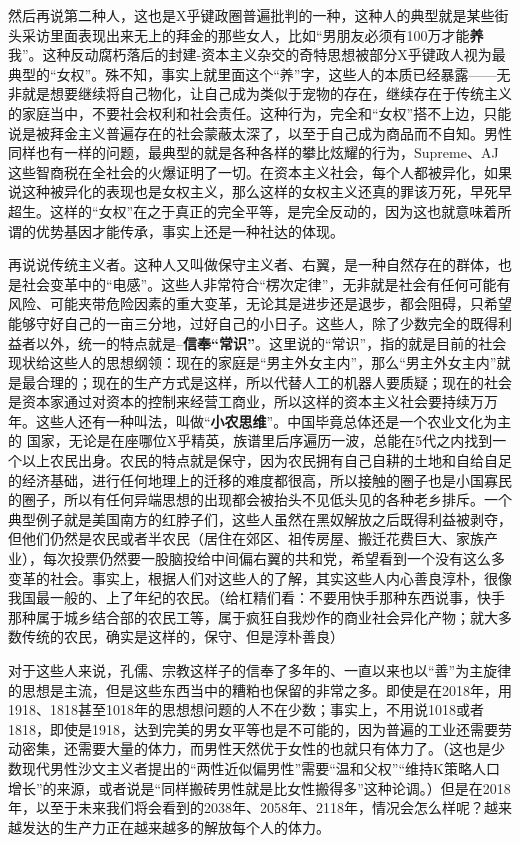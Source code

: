 \documentclass{ctexart}
\begin{document}
	然后再说第二种人，这也是X乎键政圈普遍批判的一种，这种人的典型就是某些街头采访里面表现出来无上的拜金的那些女人，比如“男朋友必须有100万才能{\bf 养}我”。这种反动腐朽落后的封建-资本主义杂交的奇特思想被部分X乎键政人视为最典型的“女权”。殊不知，事实上就里面这个“养”字，这些人的本质已经暴露——无非就是想要继续将自己物化，让自己成为类似于宠物的存在，继续存在于传统主义的家庭当中，不要社会权利和社会责任。这种行为，完全和“女权”搭不上边，只能说是被拜金主义普遍存在的社会蒙蔽太深了，以至于自己成为商品而不自知。男性同样也有一样的问题，最典型的就是各种各样的攀比炫耀的行为，Supreme、AJ这些智商税在全社会的火爆证明了一切。在资本主义社会，每个人都被异化，如果说这种被异化的表现也是女权主义，那么这样的女权主义还真的罪该万死，早死早超生。这样的“女权”在之于真正的完全平等，是完全反动的，因为这也就意味着所谓的优势基因才能传承，事实上还是一种社达的体现。
	
	再说说传统主义者。这种人又叫做保守主义者、右翼，是一种自然存在的群体，也是社会变革中的“电感”。这些人非常符合“楞次定律”，无非就是社会有任何可能有风险、可能夹带危险因素的重大变革，无论其是进步还是退步，都会阻碍，只希望能够守好自己的一亩三分地，过好自己的小日子。这些人，除了少数完全的既得利益者以外，统一的特点就是--{\bf 信奉“常识”}。这里说的“常识”，指的就是目前的社会现状给这些人的思想纲领：现在的家庭是“男主外女主内”，那么“男主外女主内”就是最合理的；现在的生产方式是这样，所以代替人工的机器人要质疑；现在的社会是资本家通过对资本的控制来经营工商业，所以这样的资本主义社会要持续万万年。这些人还有一种叫法，叫做“{\bf 小农思维}”。中国毕竟总体还是一个农业文化为主的
	国家，无论是在座哪位X乎精英，族谱里后序遍历一波，总能在5代之内找到一个以上农民出身。农民的特点就是保守，因为农民拥有自己自耕的土地和自给自足的经济基础，进行任何地理上的迁移的难度都很高，所以接触的圈子也是小国寡民的圈子，所以有任何异端思想的出现都会被抬头不见低头见的各种老乡排斥。一个典型例子就是美国南方的红脖子们，这些人虽然在黑奴解放之后既得利益被剥夺，但他们仍然是农民或者半农民（居住在郊区、祖传房屋、搬迁花费巨大、家族产业），每次投票仍然要一股脑投给中间偏右翼的共和党，希望看到一个没有这么多变革的社会。事实上，根据人们对这些人的了解，其实这些人内心善良淳朴，很像我国最一般的、上了年纪的农民。（给杠精们看：不要用快手那种东西说事，快手那种属于城乡结合部的农民工等，属于疯狂自我炒作的商业社会异化产物；就大多数传统的农民，确实是这样的，保守、但是淳朴善良）
	
	对于这些人来说，孔儒、宗教这样子的信奉了多年的、一直以来也以“善”为主旋律的思想是主流，但是这些东西当中的糟粕也保留的非常之多。即使是在2018年，用1918、1818甚至1018年的思想想问题的人不在少数；事实上，不用说1018或者1818，即使是1918，达到完美的男女平等也是不可能的，因为普遍的工业还需要劳动密集，还需要大量的体力，而男性天然优于女性的也就只有体力了。（这也是少数现代男性沙文主义者提出的“两性近似偏男性”需要“温和父权”“维持K策略人口增长”的来源，或者说是“同样搬砖男性就是比女性搬得多”这种论调。）但是在2018年，以至于未来我们将会看到的2038年、2058年、2118年，情况会怎么样呢？越来越发达的生产力正在越来越多的解放每个人的体力。
	
\end{document}
